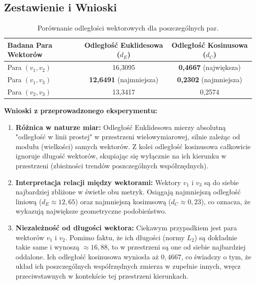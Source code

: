 \documentclass[12pt,a4paper]{article}
\begin{document}
\subsection{Zestawienie i Wnioski}

\begin{table}[h!]
\centering
\caption{Porównanie odległości wektorowych dla poszczególnych par.}
\label{tab:odleglosci}
\begin{tabular}{@{}lcc@{}}
\toprule
Badana Para Wektorów & Odległość Euklidesowa ($d_E$) & Odległość Kosinusowa ($d_C$) \\ \midrule
Para $(v_1, v_2)$ & 16,3095 & \textbf{0,4667} (największa) \\
Para $(v_1, v_3)$ & \textbf{12,6491} (najmniejsza) & \textbf{0,2302} (najmniejsza) \\
Para $(v_2, v_3)$ & 13,3417 & 0,2574 \\ \bottomrule
\end{tabular}
\end{table}

\textbf{Wnioski z przeprowadzonego eksperymentu:}
\begin{enumerate}
    \item \textbf{Różnica w naturze miar:} Odległość Euklidesowa mierzy absolutną "odległość w linii prostej" w przestrzeni wielowymiarowej, silnie zależąc od modułu (wielkości) samych wektorów. Z kolei odległość kosinusowa całkowicie ignoruje długość wektorów, skupiając się wyłącznie na ich kierunku w przestrzeni (zbieżności trendów poszczególnych współrzędnych).
    \item \textbf{Interpretacja relacji między wektorami:} Wektory $v_1$ i $v_3$ są do siebie najbardziej zbliżone w świetle obu metryk. Osiągają najmniejszą odległość liniową ($d_E \approx 12,65$) oraz najmniejszą kosinusową ($d_C \approx 0,23$), co oznacza, że wykazują największe geometryczne podobieństwo.
    \item \textbf{Niezależność od długości wektora:} Ciekawym przypadkiem jest para wektorów $v_1$ i $v_2$. Pomimo faktu, że ich długości (normy $L_2$) są dokładnie takie same i wynoszą $\approx 16,88$, to w przestrzeni są one od siebie najbardziej oddalone. Ich odległość kosinusowa wyniosła aż $0,4667$, co świadczy o tym, że układ ich poszczególnych współrzędnych zmierza w zupełnie innych, wręcz przeciwstawnych w kontekście tej przestrzeni kierunkach.
\end{enumerate}
\end{document}
